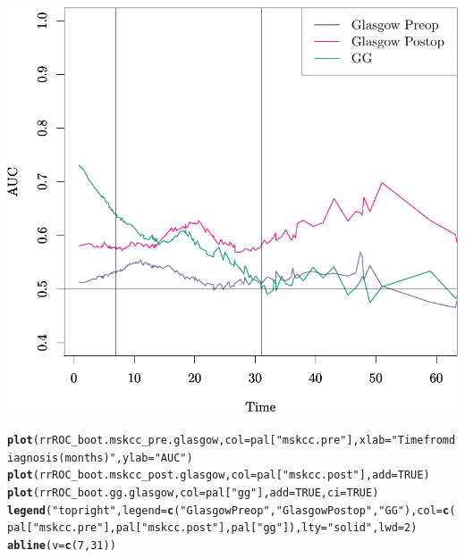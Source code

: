 \documentclass{article}\usepackage[]{graphicx}\usepackage[]{color}
\makeatletter
\def\maxwidth{ %
  \ifdim\Gin@nat@width>\linewidth
    \linewidth
  \else
    \Gin@nat@width
  \fi
}
\newcommand{\hlnum}[1]{\textcolor[rgb]{0.686,0.059,0.569}{#1}}%
\newcommand{\hlstr}[1]{\textcolor[rgb]{0.192,0.494,0.8}{#1}}%
\newcommand{\hlstd}[1]{\textcolor[rgb]{0.345,0.345,0.345}{#1}}%
\newcommand{\hlkwc}[1]{\textcolor[rgb]{0.333,0.667,0.333}{#1}}%
\newcommand{\hlkwd}[1]{\textcolor[rgb]{0.737,0.353,0.396}{\textbf{#1}}}%
\newenvironment{kframe}{%
 \def\at@end@of@kframe{}%
 \ifinner\ifhmode%
  \def\at@end@of@kframe{\end{minipage}}%
  \begin{minipage}{\columnwidth}%
 \fi\fi%
 \def\FrameCommand##1{\hskip\@totalleftmargin \hskip-\fboxsep
 \colorbox{shadecolor}{##1}\hskip-\fboxsep
     \hskip-\linewidth \hskip-\@totalleftmargin \hskip\columnwidth}%
 \MakeFramed {\advance\hsize-\width
   \@totalleftmargin\z@ \linewidth\hsize
   \@setminipage}}%
 {\par\unskip\endMakeFramed%
 \at@end@of@kframe}
\newenvironment{knitrout}{}{} %
\makeatother
\begin{document}
\begin{knitrout}
{\centering \includegraphics[width=\maxwidth]{figure/07-risksetROC-plot-glasgow-1} 

}


\begin{kframe}\begin{alltt}
\hlkwd{plot}\hlstd{(rrROC_boot.mskcc_pre.glasgow,} \hlkwc{col} \hlstd{= pal[}\hlstr{"mskcc.pre"}\hlstd{],} \hlkwc{xlab} \hlstd{=} \hlstr{"Time from diagnosis (months)"}\hlstd{,} \hlkwc{ylab} \hlstd{=} \hlstr{"AUC"}\hlstd{)}
\hlkwd{plot}\hlstd{(rrROC_boot.mskcc_post.glasgow,} \hlkwc{col} \hlstd{= pal[}\hlstr{"mskcc.post"}\hlstd{],} \hlkwc{add} \hlstd{=} \hlnum{TRUE}\hlstd{)}
\hlkwd{plot}\hlstd{(rrROC_boot.gg.glasgow,} \hlkwc{col} \hlstd{= pal[}\hlstr{"gg"}\hlstd{],} \hlkwc{add} \hlstd{=} \hlnum{TRUE}\hlstd{,} \hlkwc{ci} \hlstd{=} \hlnum{TRUE}\hlstd{)}
\hlkwd{legend}\hlstd{(}\hlstr{"topright"}\hlstd{,} \hlkwc{legend} \hlstd{=} \hlkwd{c}\hlstd{(}\hlstr{"Glasgow Preop"}\hlstd{,} \hlstr{"Glasgow Postop"}\hlstd{,} \hlstr{"GG"}\hlstd{),} \hlkwc{col} \hlstd{=} \hlkwd{c}\hlstd{(pal[}\hlstr{"mskcc.pre"}\hlstd{], pal[}\hlstr{"mskcc.post"}\hlstd{], pal[}\hlstr{"gg"}\hlstd{]),} \hlkwc{lty} \hlstd{=} \hlstr{"solid"}\hlstd{,} \hlkwc{lwd} \hlstd{=} \hlnum{2}\hlstd{)}
\hlkwd{abline}\hlstd{(}\hlkwc{v} \hlstd{=} \hlkwd{c}\hlstd{(}\hlnum{7}\hlstd{,} \hlnum{31}\hlstd{))}
\end{alltt}
\end{kframe}


\end{knitrout}
\end{document}
